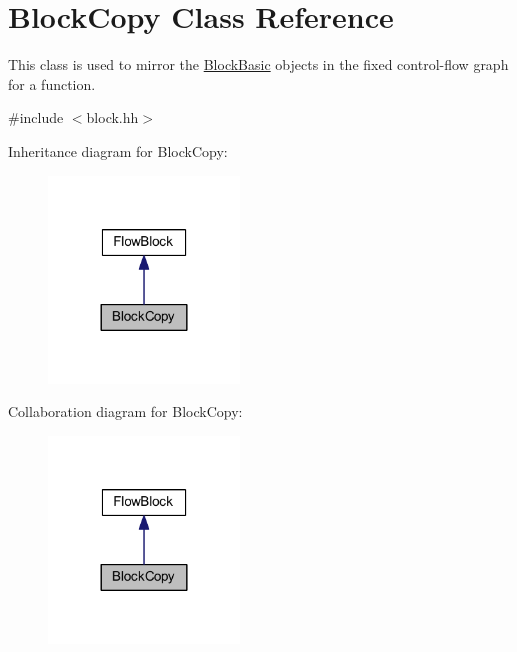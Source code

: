 \hypertarget{class_block_copy}{}\section{Block\+Copy Class Reference}
\label{class_block_copy}


This class is used to mirror the \mbox{\hyperlink{class_block_basic}{Block\+Basic}} objects in the fixed control-\/flow graph for a function.  




{\ttfamily \#include $<$block.\+hh$>$}



Inheritance diagram for Block\+Copy\+:
\nopagebreak
\begin{figure}[H]
\begin{center}
\leavevmode
\includegraphics[width=144pt]{class_block_copy__inherit__graph}
\end{center}
\end{figure}


Collaboration diagram for Block\+Copy\+:
\nopagebreak
\begin{figure}[H]
\begin{center}
\leavevmode
\includegraphics[width=144pt]{class_block_copy__coll__graph}
\end{center}
\end{figure}
